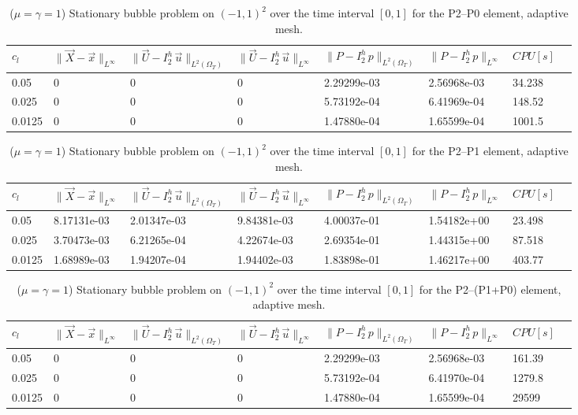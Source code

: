 \documentclass[a4paper,12pt,onecolumn]{article}
\newcommand{\errorXx}{\|\vec{X} - \vec{x}\|_{L^\infty}}
\newcommand{\LerrorUu}[1]{\|\vec U - I^h_{#1}\,\vec u\|_{L^2(\Omega_T)}}
\newcommand{\errorUu}[1]{\|\vec U - I^h_{#1}\,\vec u\|_{L^\infty}}
\newcommand{\errorPp}[1]{\|P - I^h_{#1}\,p\|_{L^\infty}}
\newcommand{\LerrorPp}[1]{\|P - I^h_{#1}\,p\|_{L^2(\Omega_T)}}
\begin{document}
\begin{table}
 \center
 \hspace*{-2cm}
\begin{tabular}{llllllll}
\hline
$c_l$ & $\errorXx$ & $\LerrorUu2$ & $\errorUu2$ & $\LerrorPp2$ & $\errorPp2$ & $CPU[s]$ \\
\hline
0.05 & 0 & 0 & 0 & 2.29299e-03 & 2.56968e-03 & 34.238\\
0.025 & 0 & 0 & 0 & 5.73192e-04 & 6.41969e-04 & 148.52\\
0.0125 & 0 & 0 & 0& 1.47880e-04 & 1.65599e-04 & 1001.5\\
\hline
\end{tabular}
\hspace*{-2cm}
\caption{($\mu=\gamma=1$) Stationary bubble problem on $(-1,1)^2$ over the time interval $[0,1]$ for the P2--P0 element, adaptive mesh.}
\label{tab:bubble2Dp2p0adaptive}
\end{table}

\begin{table}
 \center
 \hspace*{-2cm}
\begin{tabular}{llllllll}
\hline
$c_l$ & $\errorXx$ & $\LerrorUu2$ & $\errorUu2$ & $\LerrorPp2$ & $\errorPp2$ & $CPU[s]$ \\
\hline
0.05 & 8.17131e-03 & 2.01347e-03 & 9.84381e-03 & 4.00037e-01 & 1.54182e+00 & 23.498\\
0.025 & 3.70473e-03 & 6.21265e-04 & 4.22674e-03 & 2.69354e-01 & 1.44315e+00 & 87.518\\
0.0125 & 1.68989e-03 & 1.94207e-04 & 1.94402e-03 & 1.83898e-01 & 1.46217e+00 & 403.77\\
\hline
\end{tabular}
\hspace*{-2cm}
\caption{($\mu=\gamma=1$) Stationary bubble problem on $(-1,1)^2$ over the time interval $[0,1]$ for the P2--P1 element, adaptive mesh.}
\label{tab:bubble2Dp2p1adaptive}
\end{table}

\begin{table}
 \center
 \hspace*{-2cm}
\begin{tabular}{llllllll}
\hline
$c_l$ & $\errorXx$ & $\LerrorUu2$ & $\errorUu2$ & $\LerrorPp2$ & $\errorPp2$ & $CPU[s]$ \\
\hline
0.05 & 0 & 0 & 0 & 2.29299e-03 & 2.56968e-03 & 161.39\\
0.025 & 0 & 0 & 0 & 5.73192e-04 & 6.41970e-04 & 1279.8\\
0.0125 & 0 & 0 & 0 & 1.47880e-04 & 1.65599e-04 & 29599\\
\hline
\end{tabular}
\hspace*{-2cm}
\caption{($\mu=\gamma=1$) Stationary bubble problem on $(-1,1)^2$ over the time interval $[0,1]$ for the P2--(P1+P0) element, adaptive mesh.}
\label{tab:bubble2Dp2p1p0adaptive}
\end{table}
\end{document}
